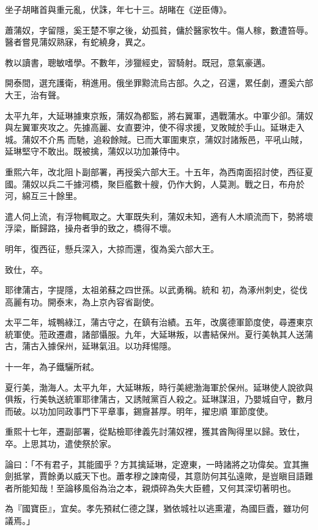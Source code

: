 \begin{pinyinscope}
 坐子胡睹首與重元亂，伏誅，年七十三。胡睹在《逆臣傳》。



 蕭蒲奴，字留隱，奚王楚不寧之後，幼孤貧，傭於醫家牧牛。傷人稼，數遭笞辱。醫者嘗見蒲奴熟寐，有蛇繞身，異之。



 教以讀書，聰敏嗜學。不數年，涉獵經史，習騎射。既冠，意氣豪邁。



 開泰間，選充護衛，稍進用。俄坐罪黥流烏古部。久之，召還，累任劇，遷奚六部大王，治有聲。



 太平九年，大延琳據東京叛，蒲奴為都監，將右翼軍，遇戰蒲水。中軍少卻。蒲奴與左翼軍夾攻之。先據高麗、女直要沖，使不得求援，叉敗賊於手山。延琳走入城。蒲奴不介馬
 而馳，追殺餘賊。已而大軍圍東京，蒲奴討諸叛邑，平吼山賊，延琳堅守不敢出。既被擒，蒲奴以功加兼侍中。



 重熙六年，改北阻卜副部署，再授奚六部大王。十五年，為西南面招討使，西征夏國。蒲奴以兵二千據河橋，聚巨艦數十艘，仍作大鉤，人莫測。戰之日，布舟於河，綿互三十餘里。



 遣人伺上流，有浮物輒取之。大軍既失利，蒲奴未知，適有人木順流而下，勢將壞浮梁，斷歸路，操舟者爭的致之，橋得不壞。



 明年，復西征，懸兵深入，大掠而還，復為奚六部大王。



 致仕，卒。



 耶律蒲古，字提隱，太祖弟蘇之四世孫。以武勇稱。統和
 初，為涿州刺史，從伐高麗有功。開泰末，為上京內容省副使。



 太平二年，城鴨綠江，蒲古守之，在鎮有治績。五年，改廣德軍節度使，尋遷東京統軍使。蒞政遷肅，諸部懾服。九年，大延琳叛，以書結保州。夏行美執其人送蒲古，蒲古入據保州，延琳氣沮。以功拜惕隱。



 十一年，為子鐵驪所弒。



 夏行美，渤海人。太平九年，大延琳叛，時行美總渤海軍於保州。延琳使人說欲與俱叛，行美執送統軍耶律蒲古，又誘賊黨百人殺之。延琳謀沮，乃嬰城自守，數月而破。以功加同政事門下平章事，錫齎甚厚。明年，擢忠順
 軍節度使。



 重熙十七年，遷副部署，從點檢耶律義先討蒲奴裡，獲其酋陶得里以歸。致仕，卒。上思其功，遣使祭於家。



 論曰：「不有君子，其能國乎？方其擒延琳，定遼東，一時諸將之功偉矣。宜其撫劍抵掌，賈餘勇以威天下也。蕭孝穆之諫南侵，其意防何其弘遠歟，是豈瞋目語難者所能知哉！至論移風俗為治之本，親煩碎為失大臣體，又何其深切著明也。



 為『國寶臣』，宜矣。孝先預弒仁德之謀，猶依城社以逃熏灌，為國巨蠹，雖功何議焉。」



\end{pinyinscope}